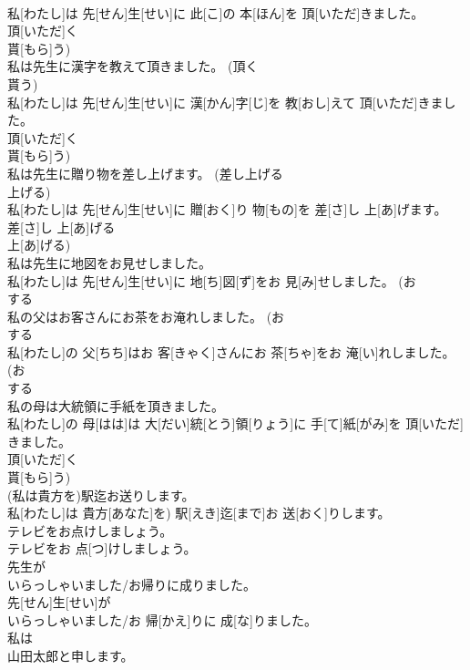 \documentclass[8pt]{extreport}
\begin{document}
\begin{CJK}{UTF8}{min}
\\	私[わたし]は 先[せん]生[せい]に 此[こ]の 本[ほん]を 頂[いただ]きました。 
\\	頂[いただ]く 
\\	貰[もら]う)
\\	私は先生に漢字を教えて頂きました。 (頂く 
\\	貰う)	
\\	私[わたし]は 先[せん]生[せい]に 漢[かん]字[じ]を 教[おし]えて 頂[いただ]きました。 
\\	頂[いただ]く 
\\	貰[もら]う)
\\	私は先生に贈り物を差し上げます。 (差し上げる 
\\	上げる)	
\\	私[わたし]は 先[せん]生[せい]に 贈[おく]り 物[もの]を 差[さ]し 上[あ]げます。 
\\	差[さ]し 上[あ]げる 
\\	上[あ]げる)
\\	私は先生に地図をお見せしました。	
\\	私[わたし]は 先[せん]生[せい]に 地[ち]図[ず]をお 見[み]せしました。 (お 
\\	する 
\\	私の父はお客さんにお茶をお淹れしました。 (お 
\\	する 
\\	私[わたし]の 父[ちち]はお 客[きゃく]さんにお 茶[ちゃ]をお 淹[い]れしました。 (お 
\\	する 
\\	私の母は大統領に手紙を頂きました。	
\\	私[わたし]の 母[はは]は 大[だい]統[とう]領[りょう]に 手[て]紙[がみ]を 頂[いただ]きました。 
\\	頂[いただ]く 
\\	貰[もら]う)
\\	(私は貴方を)駅迄お送りします。	
\\	私[わたし]は 貴方[あなた]を) 駅[えき]迄[まで]お 送[おく]りします。
\\	テレビをお点けしましょう。	
\\	テレビをお 点[つ]けしましょう。
\\	先生が
\\	いらっしゃいました/お帰りに成りました。	
\\	先[せん]生[せい]が
\\	いらっしゃいました/お 帰[かえ]りに 成[な]りました。 
\\	私は
\\	山田太郎と申します。	

\end{CJK}
\end{document}

